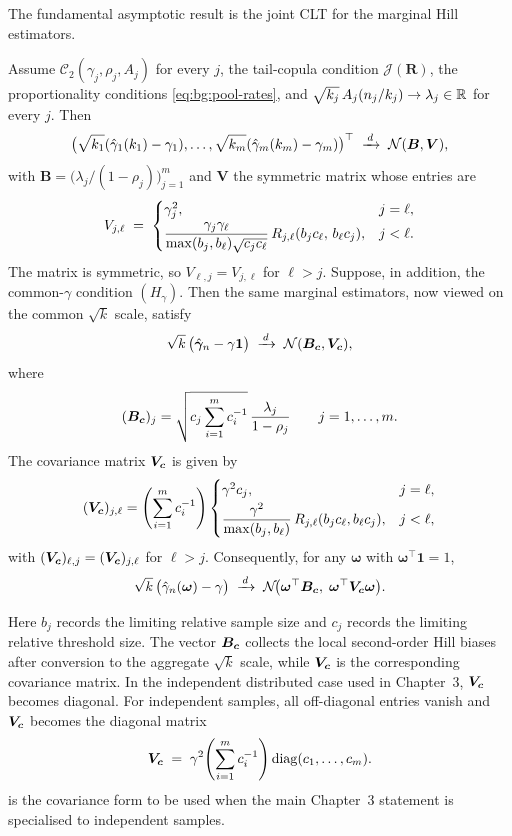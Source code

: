 The fundamental asymptotic result is the joint CLT for the marginal
Hill estimators.

\begin{theorem}
\label{thm:bg:pool-hill}
Assume $\mathcal C_{2}(\gamma_{j}, \rho_{j}, A_{j})$ for every $j$,
the tail-copula condition $\mathcal J(\bm R)$, the
proportionality conditions \eqref{eq:bg:pool-rates}, and
$\sqrt{k_{j}}\, A_{j}(n_{j}/k_{j}) \to \lambda_{j} \in \mathbb{R}$ for every
$j$. Then
\[
  \big(\sqrt{k_{1}}(\hat\gamma_{1}(k_{1}) - \gamma_{1}),
       \ldots,
       \sqrt{k_{m}}(\hat\gamma_{m}(k_{m}) - \gamma_{m})\big)^{\top}
  \;\xrightarrow{\,d\,}\;
  \mathcal N(\bm B, \bm V),
\]
with $\bm B = \big(\lambda_{j}/(1 - \rho_{j})\big)_{j=1}^{m}$ and
$\bm V$ the symmetric matrix whose entries are
\[
  V_{j, \ell}
  \;=\;
  \begin{cases}
    \gamma_{j}^{2}, & j = \ell, \\[2pt]
    \displaystyle
    \frac{\gamma_{j}\gamma_{\ell}}
         {\max(b_j,b_\ell)\sqrt{c_jc_\ell}}\,
      R_{j,\ell}(b_jc_\ell,\, b_\ell c_j),
        & j < \ell.
  \end{cases}
\]
The matrix is symmetric, so $V_{\ell,j}=V_{j,\ell}$ for $\ell>j$.
Suppose, in addition, the common-$\gamma$ condition
$(H_{\gamma})$. Then the same marginal estimators, now viewed on the
common $\sqrt{k}$ scale, satisfy
\[
  \sqrt{k}\,\big(\hat{\bm\gamma}_{n}-\gamma\bm 1\big)
  \;\xrightarrow{\,d\,}\;
  \mathcal N(\bm{B}_{\bm{c}},\bm{V}_{\bm{c}}),
\]
where
\[
  (\bm{B}_{\bm{c}})_j
  =
  \sqrt{c_j\sum_{i=1}^{m} c_i^{-1}}\,
  \frac{\lambda_j}{1-\rho_j}
  \qquad j=1,\ldots,m.
\]
The covariance matrix $\bm{V}_{\bm{c}}$ is given by
\[
  (\bm{V}_{\bm{c}})_{j,\ell}
  =
  \left(\sum_{i = 1}^{m} c_i^{-1}\right)
  \begin{cases}
    \gamma^{2}c_j, & j=\ell, \\[2pt]
    \displaystyle
    \frac{\gamma^{2}}{\max(b_j,b_\ell)}\,
      R_{j,\ell}(b_jc_\ell,b_\ell c_j),
      & j<\ell,
  \end{cases}
\]
with $(\bm{V}_{\bm{c}})_{\ell,j}=(\bm{V}_{\bm{c}})_{j,\ell}$ for $\ell>j$.
Consequently, for any $\bm\omega$ with $\bm\omega^{\top}\bm 1 = 1$,
\[
  \sqrt{k}\,\big(\hat\gamma_{n}(\bm\omega) - \gamma\big)
  \;\xrightarrow{\,d\,}\;
  \mathcal N\!\big(\bm\omega^{\top}\bm{B}_{\bm{c}},\;
                    \bm\omega^{\top}\bm{V}_{\bm{c}}\bm\omega\big).
\]
\end{theorem}

Here \(b_j\) records the limiting relative sample size and \(c_j\) records the
limiting relative threshold size. The vector \(\bm{B}_{\bm{c}}\) collects the local
second-order Hill biases after conversion to the aggregate \(\sqrt{k}\) scale,
while \(\bm{V}_{\bm{c}}\) is the corresponding covariance matrix. In the independent
distributed case used in Chapter~3, \(\bm{V}_{\bm{c}}\) becomes diagonal.
For independent samples, all off-diagonal entries vanish and $\bm{V}_{\bm{c}}$
becomes the diagonal matrix
\begin{equation}
\label{eq:bg:V_c-diagonal}
  \bm{V}_{\bm{c}}
  \;=\;
  \gamma^{2}\!\left(\sum_{i = 1}^{m} c_{i}^{-1}\right)
    \mathrm{diag}(c_{1}, \ldots, c_{m}).
\end{equation}
 is the covariance form to be used when the
main Chapter~3 statement is specialised to independent samples.

